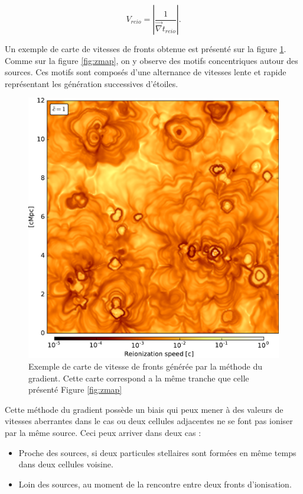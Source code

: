 \begin{equation}
V_{reio}  = \left | \frac{1}{ \vec{\nabla} t_{reio}} \right| .
\end{equation}

Un exemple de carte de vitesses de fronts obtenue est présenté sur la figure \ref{fig:vmap}.
Comme sur la figure \ref{fig:zmap}, on y observe des motifs concentriques autour des sources.
Ces motifs sont composés d'une alternance de vitesses lente et rapide représentant les génération successives d'étoiles.

\begin{figure}
        \includegraphics[width=.95\linewidth]{img/04_mapreio/map_v_c1.pdf} 
        \caption[Carte de vitesse des fronts d'ionisation]{Exemple de carte de vitesse de fronts générée par la méthode du gradient.
		 Cette carte correspond a la même tranche que celle présenté Figure \ref{fig:zmap}
        }
 		\label{fig:vmap}
\end{figure}

Cette méthode du gradient possède un biais qui peux mener à des valeurs de vitesses aberrantes dans le cas ou deux cellules adjacentes ne se font pas ioniser par la même source.
Ceci peux arriver dans deux cas : 
\begin{itemize}
\item Proche des sources, si deux particules stellaires sont formées en même temps dans deux cellules voisine.
\item Loin des sources, au moment de la rencontre entre deux fronts d'ionisation.
\end{itemize}

